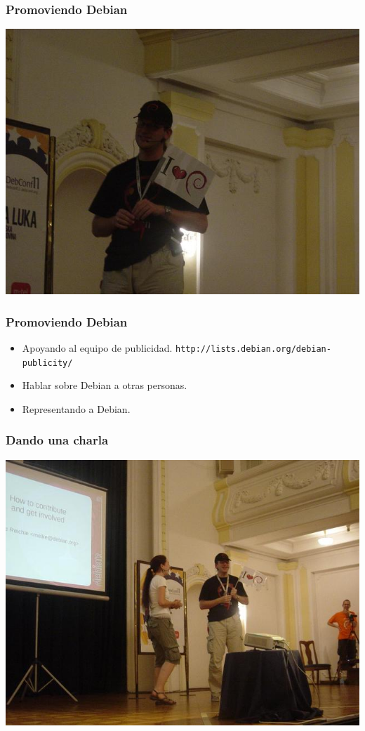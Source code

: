 \documentclass{beamer}
\begin{document}
\begin{frame}
\frametitle{Promoviendo Debian}
        \begin{center}
                 \includegraphics[scale=0.50]{../img/debianfanboy.JPG}
        \end{center}
\end{frame}

\begin{frame}
\frametitle{Promoviendo Debian}
        \begin{itemize}
                \pause \item Apoyando al equipo de publicidad. \texttt{http://lists.debian.org/debian-publicity/}
                \pause \item Hablar sobre Debian a otras personas. 
                \pause \item Representando a Debian.
        \end{itemize}

\end{frame}

\begin{frame}
\frametitle{Dando una charla}
        \begin{center}
                \includegraphics[scale=0.40]{../img/DSC00331.JPG}
        \end{center}

\end{frame}
\end{document}
